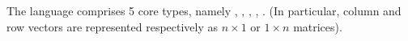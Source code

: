 The language comprises 5 core types, namely \integ, \float, \complex, \qubit, \mat. (In particular, column and row vectors are represented respectively as $n\times1$ or $1\times n$ matrices).
